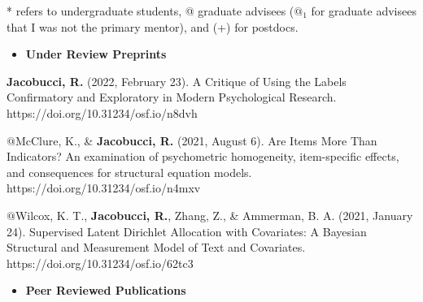 \documentclass[letterpaper,10pt]{article}
\begin{document}
* refers to undergraduate students, @ graduate advisees ($@_{1}$ for graduate advisees that I was not the primary mentor), and (+) for postdocs.
\begin{itemize} 
	\setlength{\topsep}{0pt}%
	\setlength{\leftmargin}{0.1in}%
	\setlength{\listparindent}{-0.1in}%
	\setlength{\itemindent}{-0.2in}%
	\setlength{\parsep}{\parskip}%
	
	\item {\textbf{\large{Under Review Preprints}}}
\end{itemize}
\begin{etaremune}
\item \textbf{Jacobucci, R.} (2022, February 23). A Critique of Using the Labels Confirmatory and Exploratory in Modern Psychological Research. https://doi.org/10.31234/osf.io/n8dvh

\item $@$McClure, K., \& \textbf{Jacobucci, R.} (2021, August 6). Are Items More Than Indicators? An examination of psychometric homogeneity, item-specific effects, and consequences for structural equation models. https://doi.org/10.31234/osf.io/n4mxv

\item $@$Wilcox, K. T., \textbf{Jacobucci, R.}, Zhang, Z., \& Ammerman, B. A. (2021, January 24). Supervised Latent Dirichlet Allocation with Covariates: A Bayesian Structural and Measurement Model of Text and Covariates. https://doi.org/10.31234/osf.io/62tc3

	
	\end{etaremune}
\vspace{3mm}
\begin{itemize}
	\item {\textbf{\large{Peer Reviewed Publications}}}
\end{itemize}
\end{document}
